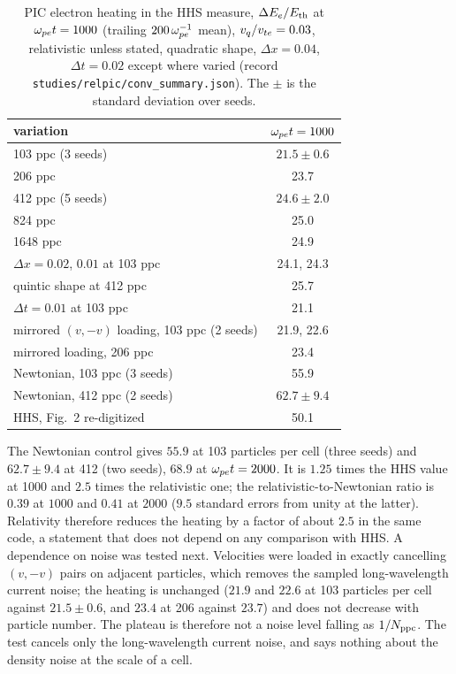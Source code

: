 \begin{table}[t]
\centering
\caption{PIC electron heating in the HHS measure, $\Delta E_e/E_{\rm th}$ at $\omega_{pe} t=1000$ (trailing $200\,\omega_{pe}^{-1}$ mean), $v_q/v_{te}=0.03$, relativistic unless stated, quadratic shape, $\Delta x=0.04$, $\Delta t=0.02$ except where varied (record \texttt{studies/relpic/conv\_summary.json}). The $\pm$ is the standard deviation over seeds.}\label{tab:c10-pic}
\small
\begin{tabular}{@{}lc@{}}\toprule
variation & $\omega_{pe} t=1000$\\\midrule
103 ppc (3 seeds) & $21.5\pm0.6$\\
206 ppc & 23.7\\
412 ppc (5 seeds) & $24.6\pm2.0$\\
824 ppc & 25.0\\
1648 ppc & 24.9\\
$\Delta x=0.02$, $0.01$ at 103 ppc & 24.1, 24.3\\
quintic shape at 412 ppc & 25.7\\
$\Delta t=0.01$ at 103 ppc & 21.1\\
mirrored $(v,-v)$ loading, 103 ppc (2 seeds) & 21.9, 22.6\\
mirrored loading, 206 ppc & 23.4\\
Newtonian, 103 ppc (3 seeds) & 55.9\\
Newtonian, 412 ppc (2 seeds) & $62.7\pm9.4$\\\midrule
HHS, Fig.~2 re-digitized & 50.1\\\bottomrule
\end{tabular}
\end{table}


The Newtonian control gives $55.9$ at 103 particles per cell (three seeds) and $62.7\pm9.4$ at 412 (two seeds), $68.9$ at $\omega_{pe} t=2000$. It is $1.25$ times the HHS value at 1000 and $2.5$ times the relativistic one; the relativistic-to-Newtonian ratio is $0.39$ at $1000$ and $0.41$ at $2000$ ($9.5$ standard errors from unity at the latter). Relativity therefore reduces the heating by a factor of about $2.5$ in the same code, a statement that does not depend on any comparison with HHS. A dependence on noise was tested next. Velocities were loaded in exactly cancelling $(v,-v)$ pairs on adjacent particles, which removes the sampled long-wavelength current noise; the heating is unchanged ($21.9$ and $22.6$ at 103 particles per cell against $21.5\pm0.6$, and $23.4$ at 206 against $23.7$) and does not decrease with particle number. The plateau is therefore not a noise level falling as $1/N_{\rm ppc}$. The test cancels only the long-wavelength current noise, and says nothing about the density noise at the scale of a cell.


